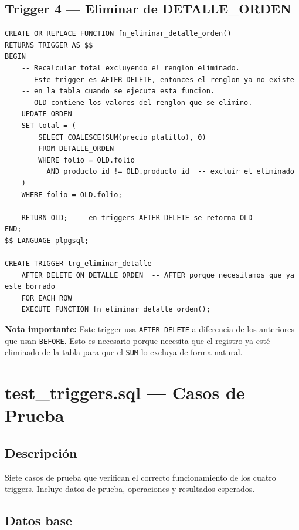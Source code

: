 \documentclass[12pt, a4paper]{article}
\begin{document}
\subsection{Trigger 4 --- Eliminar de DETALLE\_ORDEN}

\begin{lstlisting}[caption={Funci\'on del trigger de eliminaci\'on}]
CREATE OR REPLACE FUNCTION fn_eliminar_detalle_orden()
RETURNS TRIGGER AS $$
BEGIN
    -- Recalcular total excluyendo el renglon eliminado.
    -- Este trigger es AFTER DELETE, entonces el renglon ya no existe
    -- en la tabla cuando se ejecuta esta funcion.
    -- OLD contiene los valores del renglon que se elimino.
    UPDATE ORDEN
    SET total = (
        SELECT COALESCE(SUM(precio_platillo), 0)
        FROM DETALLE_ORDEN
        WHERE folio = OLD.folio
          AND producto_id != OLD.producto_id  -- excluir el eliminado
    )
    WHERE folio = OLD.folio;

    RETURN OLD;  -- en triggers AFTER DELETE se retorna OLD
END;
$$ LANGUAGE plpgsql;

CREATE TRIGGER trg_eliminar_detalle
    AFTER DELETE ON DETALLE_ORDEN  -- AFTER porque necesitamos que ya este borrado
    FOR EACH ROW
    EXECUTE FUNCTION fn_eliminar_detalle_orden();
\end{lstlisting}

\textbf{Nota importante:} Este trigger usa \texttt{AFTER DELETE} a diferencia de los anteriores que usan \texttt{BEFORE}. Esto es necesario porque necesita que el registro ya est\'e eliminado de la tabla para que el \texttt{SUM} lo excluya de forma natural.

\section{test\_triggers.sql --- Casos de Prueba}

\subsection{Descripci\'on}

Siete casos de prueba que verifican el correcto funcionamiento de los cuatro triggers. Incluye datos de prueba, operaciones y resultados esperados.

\subsection{Datos base}
\end{document}
